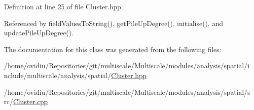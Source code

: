 Definition at line 25 of file Cluster.\-hpp.



Referenced by field\-Values\-To\-String(), get\-Pile\-Up\-Degree(), initialise(), and update\-Pile\-Up\-Degree().



The documentation for this class was generated from the following files\-:\begin{DoxyCompactItemize}
\item 
/home/ovidiu/\-Repositories/git/multiscale/\-Multiscale/modules/analysis/spatial/include/multiscale/analysis/spatial/\hyperlink{Cluster_8hpp}{Cluster.\-hpp}\item 
/home/ovidiu/\-Repositories/git/multiscale/\-Multiscale/modules/analysis/spatial/src/\hyperlink{Cluster_8cpp}{Cluster.\-cpp}\end{DoxyCompactItemize}
